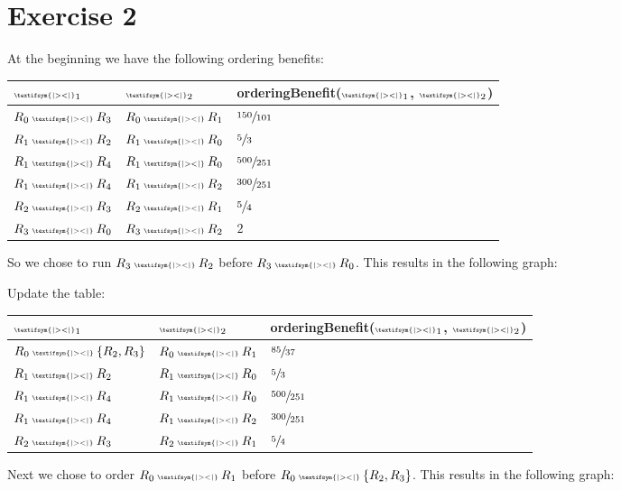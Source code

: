 \documentclass{scrartcl}
\newcommand{\join}{\mathbin{\text{\begin{tiny}\textifsym{|><|}\end{tiny}}}}
\begin{document}
\section*{Exercise 2}

At the beginning we have the following ordering benefits:

\begin{table}[h]
\begin{tabular}{lll}
$\join_1$ & $\join_2$ & orderingBenefit($\join_1$, $\join_2$) \\ \hline
$R_0 \join R_3$ & $R_0 \join R_1$ & $\sfrac{150}{101}$ \\
$R_1 \join R_2$ & $R_1 \join R_0$ & $\sfrac{5}{3}$ \\
$R_1 \join R_4$ & $R_1 \join R_0$ & $\sfrac{500}{251}$ \\
$R_1 \join R_4$ & $R_1 \join R_2$ & $\sfrac{300}{251}$ \\
$R_2 \join R_3$ & $R_2 \join R_1$ & $\sfrac{5}{4}$ \\
$R_3 \join R_0$ & $R_3 \join R_2$ & $2$
\end{tabular}
\end{table}

So we chose to run $R_3 \join R_2$ before $R_3 \join R_0$. This results in the
following graph:


\pagebreak

Update the table:

\begin{table}[h]
\begin{tabular}{lll}
$\join_1$ & $\join_2$ & orderingBenefit($\join_1$, $\join_2$) \\ \hline
$R_0 \join \{R_2, R_3\}$ & $R_0 \join R_1$ & $\sfrac{85}{37}$ \\
$R_1 \join R_2$ & $R_1 \join R_0$ & $\sfrac{5}{3}$ \\
$R_1 \join R_4$ & $R_1 \join R_0$ & $\sfrac{500}{251}$ \\
$R_1 \join R_4$ & $R_1 \join R_2$ & $\sfrac{300}{251}$ \\
$R_2 \join R_3$ & $R_2 \join R_1$ & $\sfrac{5}{4}$
\end{tabular}
\end{table}

Next we chose to order $R_0 \join R_1$ before $R_0 \join \{R_2, R_3\}$. This
results in the following graph:

\end{document}
